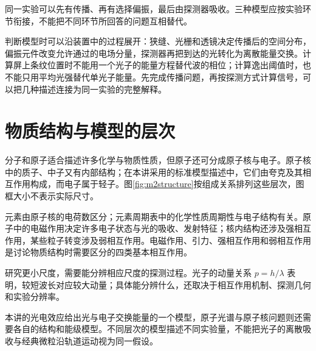 同一实验可以先有传播、再有选择偏振，最后由探测器吸收。三种模型应按实验环节衔接，不能把不同环节所回答的问题互相替代。

判断模型时可以沿装置中的过程展开：狭缝、光栅和透镜决定传播后的空间分布，偏振元件改变允许通过的电场分量，探测器再把到达的光转化为离散能量交换。计算屏上条纹位置时不能用一个光子的能量方程替代波的相位；计算逸出阈值时，也不能只用平均光强替代单光子能量。先完成传播问题，再按探测方式计算信号，可以把几种描述连接为同一实验的完整解释。

\section{物质结构与模型的层次}

分子和原子适合描述许多化学与物质性质，但原子还可分成原子核与电子。原子核中的质子、中子又有内部结构；在本讲采用的标准模型描述中，它们由夸克及其相互作用构成，而电子属于轻子。图\ref{fig:m2structure}按组成关系排列这些层次，图框大小不表示实际尺寸。

元素由原子核的电荷数区分；元素周期表中的化学性质周期性与电子结构有关。原子中的电磁作用决定许多电子状态与光的吸收、发射特征；核内结构还涉及强相互作用，某些粒子转变涉及弱相互作用。电磁作用、引力、强相互作用和弱相互作用是讨论物质结构时需要区分的四类基本相互作用。

研究更小尺度，需要能分辨相应尺度的探测过程。光子的动量关系 \(p=h/\lambda\) 表明，较短波长对应较大动量；具体能分辨什么，还取决于相互作用机制、探测几何和实验分辨率。

本讲的光电效应给出光与电子交换能量的一个模型，原子光谱与原子核问题则还需要各自的结构和能级模型。不同层次的模型描述不同实验量，不能把光子的离散吸收与经典微粒沿轨道运动视为同一假设。
